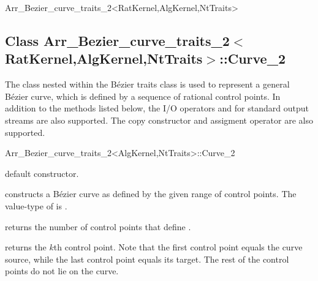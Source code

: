 \begin{ccRefClass}{Arr_Bezier_curve_traits_2<RatKernel,AlgKernel,NtTraits>}

\ccIsModel

\ccTypes



\subsection*{Class
         Arr\_Bezier\_curve\_traits\_2$<$RatKernel,AlgKernel,NtTraits$>$::Curve\_2}

The  class nested within the B\'ezier traits class is used
to represent a general B\'ezier curve, which is defined by a sequence
of rational control points. In addition to the methods listed below, the
I/O operators  and  for standard output
streams are also supported. The copy constructor and assigment operator
are also supported.

\begin{ccClass}{Arr_Bezier_curve_traits_2<AlgKernel,NtTraits>::Curve_2}
% 
\ccCreation
{}

  {default constructor.}

  {constructs a B\'ezier curve as defined by the given range of control
   points. The value-type of  is .}

\ccAccessFunctions

  {returns the number of control points that define \ccVar.}

  {returns the $k$th control point. Note that the first control point equals
   the curve source, while the last control point equals its target. The rest
   of the control points do not lie on the curve.
   }


\end{ccClass}
\end{ccRefClass}
